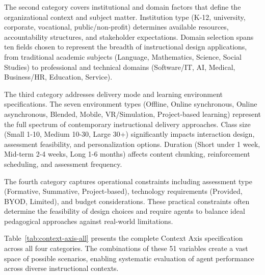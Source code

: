 The second category covers institutional and domain factors that define the organizational context and subject matter. Institution type (K-12, university, corporate, vocational, public/non-profit) determines available resources, accountability structures, and stakeholder expectations. Domain selection spans ten fields chosen to represent the breadth of instructional design applications, from traditional academic subjects (Language, Mathematics, Science, Social Studies) to professional and technical domains (Software/IT, AI, Medical, Business/HR, Education, Service).

The third category addresses delivery mode and learning environment specifications. The seven environment types (Offline, Online synchronous, Online asynchronous, Blended, Mobile, VR/Simulation, Project-based learning) represent the full spectrum of contemporary instructional delivery approaches. Class size (Small 1-10, Medium 10-30, Large 30+) significantly impacts interaction design, assessment feasibility, and personalization options. Duration (Short under 1 week, Mid-term 2-4 weeks, Long 1-6 months) affects content chunking, reinforcement scheduling, and assessment frequency.

The fourth category captures operational constraints including assessment type (Formative, Summative, Project-based), technology requirements (Provided, BYOD, Limited), and budget considerations. These practical constraints often determine the feasibility of design choices and require agents to balance ideal pedagogical approaches against real-world limitations.

Table~\ref{tab:context-axis-all} presents the complete Context Axis specification across all four categories. The combinations of these 51 variables create a vast space of possible scenarios, enabling systematic evaluation of agent performance across diverse instructional contexts.

